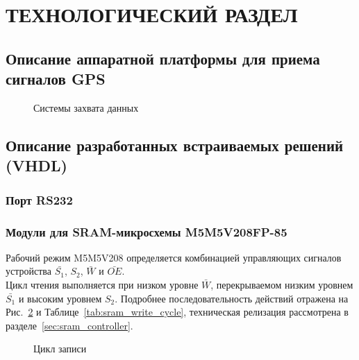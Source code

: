 \section{ТЕХНОЛОГИЧЕСКИЙ РАЗДЕЛ}

\subsection{Описание аппаратной платформы для приема сигналов GPS}

\begin{figure}[H]
\caption{Системы захвата данных}
\label{pic:board_scheme}
\end{figure}

\subsection{Описание разработанных встраиваемых решений (VHDL)}

\subsubsection{Порт RS232}
\label{razdel3_rs232}

\subsubsection{Модули для SRAM-микросхемы M5M5V208FP-85}
\label{razdel3_sram}
Рабочий режим M5M5V208 определяется комбинацией управляющих сигналов устройства $\bar{S_1}$, ${S_2}$, $\bar{W}$ и $\bar{OE}$.\\
Цикл чтения выполняется при низком уровне $\bar{W}$, перекрываемом низким уровнем $\bar{S_1}$ и высоким уровнем ${S_2}$.
Подробнее последовательность действий отражена на Рис.~\ref{pic:sram_write_cycle} и Таблице~\ref{tab:sram_write_cycle}, техническая релизация рассмотрена в
разделе~\ref{sec:sram_controller}. \\

\begin{figure}[H]
\caption{Цикл записи}
\label{pic:sram_write_cycle}
\end{figure}

